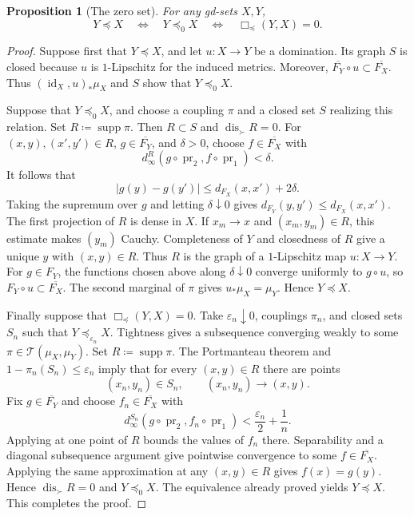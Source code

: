 \documentclass{amsart}
\theoremstyle{plain}
\newtheorem{proposition}[theorem]{Proposition}
\theoremstyle{definition}
\theoremstyle{remark}
\DeclareMathOperator{\dis}{dis}
\DeclareMathOperator{\supp}{supp}
\DeclareMathOperator{\pr}{pr}
\newcommand{\dinf}[1]{d^{#1}_{\infty}}
\newcommand{\Tplan}{\mathcal{T}}
\begin{document}
\begin{proposition}[The zero set]
\label{prop:unilateral-box-zero}
For any gd-sets $X,Y$,
\[
Y\preceq X\quad\Longleftrightarrow\quad
Y\preceq_0X\quad\Longleftrightarrow\quad
\Box_{\preceq}(Y,X)=0.
\]
\end{proposition}

\begin{proof}
Suppose first that $Y\preceq X$, and let $u\colon X\to Y$ be a
domination.  Its graph $S$ is closed because $u$ is $1$-Lipschitz for the
induced metrics.  Moreover,
$\overline{F_Y}\circ u\subset\overline{F_X}$.  Thus
$(\operatorname{id}_X,u)_*\mu_X$ and $S$ show that $Y\preceq_0X$.

Suppose that $Y\preceq_0X$, and choose a coupling $\pi$ and a closed set
$S$ realizing this relation.  Set $R\coloneqq\supp\pi$.  Then $R\subset S$
and $\dis_{\succ}R=0$.  For
$(x,y),(x',y')\in R$, $g\in\overline{F_Y}$, and $\delta>0$, choose
$f\in\overline{F_X}$ with
\[
\dinf{R}(g\circ\pr_2,f\circ\pr_1)<\delta.
\]
It follows that
\[
|g(y)-g(y')|\leq d_{F_X}(x,x')+2\delta.
\]
Taking the supremum over $g$ and letting $\delta\downarrow0$ gives
$d_{F_Y}(y,y')\leq d_{F_X}(x,x')$.  The first projection of $R$ is dense
in $X$.  If $x_m\to x$ and $(x_m,y_m)\in R$, this estimate makes
$(y_m)$ Cauchy.  Completeness of $Y$ and closedness of $R$ give a unique
$y$ with $(x,y)\in R$.  Thus $R$ is the graph of a $1$-Lipschitz map
$u\colon X\to Y$.  For $g\in F_Y$, the functions chosen above along
$\delta\downarrow0$ converge uniformly to $g\circ u$, so
$F_Y\circ u\subset\overline{F_X}$.  The second marginal of $\pi$ gives
$u_*\mu_X=\mu_Y$.  Hence $Y\preceq X$.

Finally suppose that $\Box_{\preceq}(Y,X)=0$.  Take
$\varepsilon_n\downarrow0$, couplings $\pi_n$, and closed sets $S_n$ such that
$Y\preceq_{\varepsilon_n}X$.  Tightness gives a subsequence converging weakly
to some $\pi\in\Tplan(\mu_X,\mu_Y)$.  Set $R\coloneqq\supp\pi$.  The
Portmanteau theorem and $1-\pi_n(S_n)\leq\varepsilon_n$ imply that for every
$(x,y)\in R$ there are points
\begin{equation}
\label{eq:unilateral-box-zero-support-approximation}
(x_n,y_n)\in S_n,\qquad (x_n,y_n)\longrightarrow(x,y).
\end{equation}
Fix $g\in\overline{F_Y}$ and choose $f_n\in\overline{F_X}$ with
\[ \dinf{S_n}(g\circ\pr_2,f_n\circ\pr_1) <\frac{\varepsilon_n}{2}+\frac1n. \]
Applying  at one point
of $R$ bounds the values of $f_n$ there.  Separability and a diagonal
subsequence argument give pointwise convergence to some
$f\in\overline{F_X}$.  Applying the same approximation at any
$(x,y)\in R$ gives $f(x)=g(y)$.  Hence $\dis_{\succ}R=0$ and
$Y\preceq_0X$.  The equivalence already proved yields $Y\preceq X$.
This completes the proof.
\end{proof}
\end{document}
